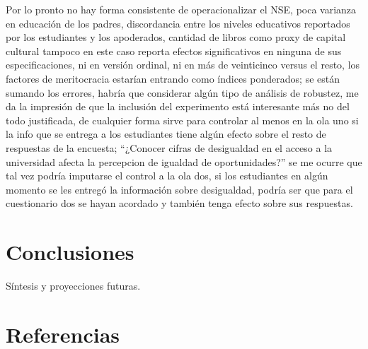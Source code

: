 \documentclass[
  spanish,
  a4paper,
  oneside]{scrbook}
\begin{document}
Por lo pronto no hay forma consistente de operacionalizar el NSE, poca
varianza en educación de los padres, discordancia entre los niveles
educativos reportados por los estudiantes y los apoderados, cantidad de
libros como proxy de capital cultural tampoco en este caso reporta
efectos significativos en ninguna de sus especificaciones, ni en versión
ordinal, ni en más de veinticinco versus el resto, los factores de
meritocracia estarían entrando como índices ponderados; se están sumando
los errores, habría que considerar algún tipo de análisis de robustez,
me da la impresión de que la inclusión del experimento está interesante
más no del todo justificada, de cualquier forma sirve para controlar al
menos en la ola uno si la info que se entrega a los estudiantes tiene
algún efecto sobre el resto de respuestas de la encuesta; ``¿Conocer
cifras de desigualdad en el acceso a la universidad afecta la percepcion
de igualdad de oportunidades?'' se me ocurre que tal vez podría
imputarse el control a la ola dos, si los estudiantes en algún momento
se les entregó la información sobre desigualdad, podría ser que para el
cuestionario dos se hayan acordado y también tenga efecto sobre sus
respuestas.


\chapter{Conclusiones}\label{conclusiones}

Síntesis y proyecciones futuras.


\chapter{Referencias}\label{referencias}
\end{document}
